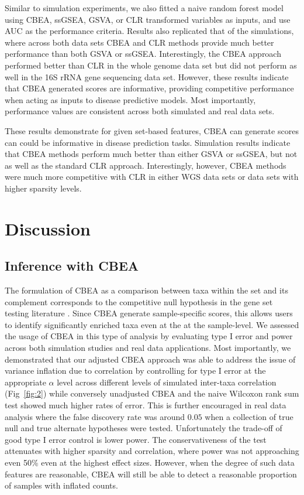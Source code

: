 \documentclass[10pt,letterpaper]{article}
\begin{document}
Similar to simulation experiments, we also fitted a naive random forest model using CBEA, ssGSEA, GSVA, or CLR transformed variables as inputs, and use AUC as the performance criteria. Results also replicated that of the simulations, where across both data sets CBEA and CLR methods provide much better performance than both GSVA or ssGSEA. Interestingly, the CBEA approach performed better than CLR in the whole genome data set but did not perform as well in the 16S rRNA gene sequencing data set. However, these results indicate that CBEA generated scores are informative, providing competitive performance when acting as inputs to disease predictive models. Most importantly, performance values are consistent across both simulated and real data sets. 

These results demonstrate for given set-based features, CBEA can generate scores can could be informative in disease prediction tasks. Simulation results indicate that CBEA methods perform much better than either GSVA or ssGSEA, but not as well as the standard CLR approach. Interestingly, however, CBEA methods were much more competitive with CLR in either WGS data sets or data sets with higher sparsity levels. 


\section*{Discussion}

\subsection*{Inference with CBEA}  
The formulation of CBEA as a comparison between taxa within the set and its complement corresponds to the competitive null hypothesis in the gene set testing literature \cite{tian2005}. Since CBEA generate sample-specific scores, this allows users to identify significantly enriched taxa even at the at the sample-level. We assessed the usage of CBEA in this type of analysis by evaluating type I error and power across both simulation studies and real data applications. Most importantly, we demonstrated that our adjusted CBEA approach was able to address the issue of variance inflation due to correlation \cite{wu2012} by controlling for type I error at the appropriate $\alpha$ level across different levels of simulated inter-taxa correlation (Fig~\ref{fig:2}) while conversely unadjusted CBEA and the naive Wilcoxon rank sum test showed much higher rates of error. This is further encouraged in real data analysis where the false discovery rate was around $0.05$ when a collection of true null and true alternate hypotheses were tested. Unfortunately the trade-off of good type I error control is lower power. The conservativeness of the test attenuates with higher sparsity and correlation, where power was not approaching even 50\% even at the highest effect sizes. However, when the degree of such data features are reasonable, CBEA will still be able to detect a reasonable proportion of samples with inflated counts.  
\end{document}
